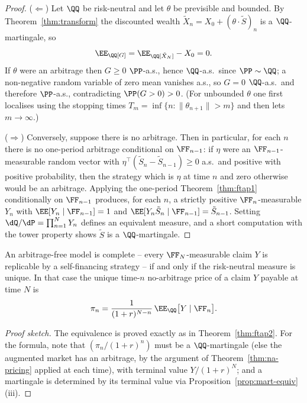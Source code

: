 \begin{proof}
	($\Leftarrow$) Let $\QQ$ be risk-neutral and let $\theta$ be previsible and bounded. By Theorem~\ref{thm:transform} the discounted wealth $\tilde X_n = X_0 + (\theta\cdot\tilde S)_n$ is a $\QQ$-martingale, so
	$$
	\EE_\QQ[G] = \EE_\QQ[\tilde X_N] - X_0 = 0.
	$$
	If $\theta$ were an arbitrage then $G \geq 0$ $\PP$-a.s., hence $\QQ$-a.s.\ since $\PP\sim\QQ$; a non-negative random variable of zero mean vanishes a.s., so $G = 0$ $\QQ$-a.s.\ and therefore $\PP$-a.s., contradicting $\PP(G>0)>0$. (For unbounded $\theta$ one first localises using the stopping times $T_m = \inf\{n : \|\theta_{n+1}\|>m\}$ and then lets $m\to\infty$.)

	($\Rightarrow$) Conversely, suppose there is no arbitrage. Then in particular, for each $n$ there is no one-period arbitrage conditional on $\FF_{n-1}$: if $\eta$ were an $\FF_{n-1}$-measurable random vector with $\eta^\top(\tilde S_n - \tilde S_{n-1})\geq 0$ a.s.\ and positive with positive probability, then the strategy which is $\eta$ at time $n$ and zero otherwise would be an arbitrage. Applying the one-period Theorem~\ref{thm:ftap1} conditionally on $\FF_{n-1}$ produces, for each $n$, a strictly positive $\FF_n$-measurable $Y_n$ with $\EE[Y_n\mid\FF_{n-1}] = 1$ and $\EE[Y_n \tilde S_n \mid \FF_{n-1}] = \tilde S_{n-1}$. Setting $\dQ/\dP = \prod_{n=1}^N Y_n$ defines an equivalent measure, and a short computation with the tower property shows $\tilde S$ is a $\QQ$-martingale.
\end{proof}

\begin{theorem}
	An arbitrage-free model is complete -- every $\FF_N$-measurable claim $Y$ is replicable by a self-financing strategy -- if and only if the risk-neutral measure is unique. In that case the unique time-$n$ no-arbitrage price of a claim $Y$ payable at time $N$ is
	$$
	\pi_n = \frac{1}{(1+r)^{N-n}}\,\EE_\QQ\big[Y \mid \FF_n\big].
	$$
\end{theorem}

\begin{proof}[Proof sketch]
	The equivalence is proved exactly as in Theorem~\ref{thm:ftap2}. For the formula, note that $(\pi_n/(1+r)^n)$ must be a $\QQ$-martingale (else the augmented market has an arbitrage, by the argument of Theorem~\ref{thm:na-pricing} applied at each time), with terminal value $Y/(1+r)^N$; and a martingale is determined by its terminal value via Proposition~\ref{prop:mart-equiv}(iii).
\end{proof}


